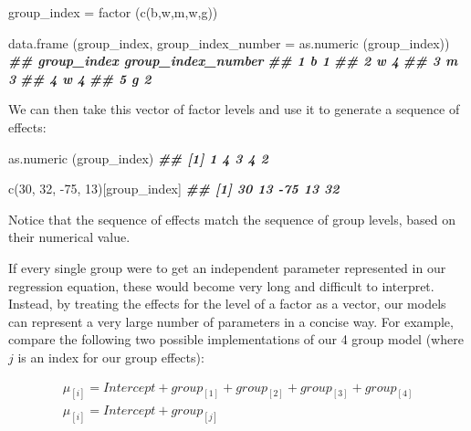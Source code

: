 \documentclass[
]{book}
\newenvironment{Shaded}{\begin{snugshade}}{\end{snugshade}}
\newcommand{\AttributeTok}[1]{\textcolor[rgb]{0.77,0.63,0.00}{#1}}
\newcommand{\DecValTok}[1]{\textcolor[rgb]{0.00,0.00,0.81}{#1}}
\newcommand{\DocumentationTok}[1]{\textcolor[rgb]{0.56,0.35,0.01}{\textbf{\textit{#1}}}}
\newcommand{\FunctionTok}[1]{\textcolor[rgb]{0.00,0.00,0.00}{#1}}
\newcommand{\NormalTok}[1]{#1}
\newcommand{\OtherTok}[1]{\textcolor[rgb]{0.56,0.35,0.01}{#1}}
\newcommand{\SpecialCharTok}[1]{\textcolor[rgb]{0.00,0.00,0.00}{#1}}
\newcommand{\StringTok}[1]{\textcolor[rgb]{0.31,0.60,0.02}{#1}}
\begin{document}
\begin{Shaded}
\begin{Highlighting}[]
\NormalTok{group\_index }\OtherTok{=} \FunctionTok{factor}\NormalTok{ (}\FunctionTok{c}\NormalTok{(}\StringTok{\textquotesingle{}b\textquotesingle{}}\NormalTok{,}\StringTok{\textquotesingle{}w\textquotesingle{}}\NormalTok{,}\StringTok{\textquotesingle{}m\textquotesingle{}}\NormalTok{,}\StringTok{\textquotesingle{}w\textquotesingle{}}\NormalTok{,}\StringTok{\textquotesingle{}g\textquotesingle{}}\NormalTok{))}

\FunctionTok{data.frame}\NormalTok{ (group\_index, }\AttributeTok{group\_index\_number =} \FunctionTok{as.numeric}\NormalTok{ (group\_index))}
\DocumentationTok{\#\#   group\_index group\_index\_number}
\DocumentationTok{\#\# 1           b                  1}
\DocumentationTok{\#\# 2           w                  4}
\DocumentationTok{\#\# 3           m                  3}
\DocumentationTok{\#\# 4           w                  4}
\DocumentationTok{\#\# 5           g                  2}
\end{Highlighting}
\end{Shaded}

We can then take this vector of factor levels and use it to generate a sequence of effects:

\begin{Shaded}
\begin{Highlighting}[]
\FunctionTok{as.numeric}\NormalTok{ (group\_index)}
\DocumentationTok{\#\# [1] 1 4 3 4 2}

\FunctionTok{c}\NormalTok{(}\DecValTok{30}\NormalTok{, }\DecValTok{32}\NormalTok{, }\SpecialCharTok{{-}}\DecValTok{75}\NormalTok{, }\DecValTok{13}\NormalTok{)[group\_index]}
\DocumentationTok{\#\# [1]  30  13 {-}75  13  32}
\end{Highlighting}
\end{Shaded}

Notice that the sequence of effects match the sequence of group levels, based on their numerical value.

If every single group were to get an independent parameter represented in our regression equation, these would become very long and difficult to interpret. Instead, by treating the effects for the level of a factor as a vector, our models can represent a very large number of parameters in a concise way. For example, compare the following two possible implementations of our 4 group model (where \(j\) is an index for our group effects):

\begin{equation}
\begin{split}
\mu_{[i]} = Intercept + group_{[1]} + group_{[2]} + group_{[3]} + group_{[4]} \\
\mu_{[i]} = Intercept + group_{[j]} \\
\end{split}
\label{eq:40}
\end{equation}
\end{document}

